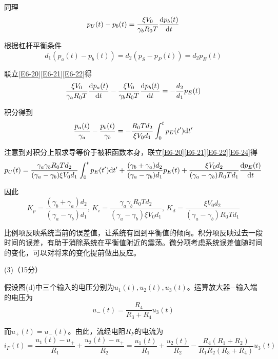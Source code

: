 \documentclass[10pt,a4paper,onecolumn,UTF8]{ctexart}
\begin{document}
	同理
	\begin{equation}\label{E6-21}
		p_U(t)-p_b(t)=\frac{\xi V_0}{\gamma_bR_0T}\frac{\mathrm{d} p_b(t)}{\mathrm{d} t}
	\end{equation}
	
	根据杠杆平衡条件
	\begin{equation}\label{E6-22}
		d_1(p_a(t)-p_b(t))=d_2(p_S-p_P(t))=d_2 p_E(t)
	\end{equation}
	
	联立\eqref{E6-20}\eqref{E6-21}\eqref{E6-22}得
	\begin{equation}\label{E6-23}
		\frac{\xi V_0}{\gamma_aR_0T}\frac{\mathrm{d} p_a(t)}{\mathrm{d} t}-\frac{\xi V_0}{\gamma_bR_0T}\frac{\mathrm{d} p_b(t)}{\mathrm{d} t}=-\frac{d_2}{d_1} p_E(t)
	\end{equation}
	
	积分得到
	\begin{equation}\label{E6-24}
		\frac{p_a(t)}{\gamma_a} -\frac{p_b(t)}{\gamma_b}=-\frac{R_0T d_2}{\xi V_0 d_1}\int_0^t p_E(t')\mathrm{d} t'
	\end{equation}
	
	注意到对积分上限求导等价于被积函数本身，联立\eqref{E6-20}\eqref{E6-21}\eqref{E6-22}\eqref{E6-24}得
	\begin{equation}\label{E6-25}
		p_U(t)=\frac{\gamma_a\gamma_bR_0Td_2}{(\gamma_a-\gamma_b)\xi V_0d_1}\int_0^t p_E(t')\mathrm{d} t'+\frac{(\gamma_b+\gamma_a)d_2}{(\gamma_a-\gamma_b)d_1}p_E(t)+\frac{\xi V_0d_2}{(\gamma_a-\gamma_b)R_0Td_1}\frac{\mathrm{d} p_E(t)}{\mathrm{d} t}
	\end{equation}
	
	因此
	\begin{equation}
		K_p=\frac{(\gamma_b+\gamma_a)d_2}{(\gamma_a-\gamma_b)d_1},\,K_i=\frac{\gamma_a\gamma_bR_0Td_2}{(\gamma_a-\gamma_b)\xi V_0d_1},\,K_d=\frac{\xi V_0d_2}{(\gamma_a-\gamma_b)R_0Td_1}
	\end{equation}
	
	比例项反映系统当前的误差值，让系统有回到平衡值的倾向。积分项反映过去一段时间的误差，有助于消除系统在平衡值附近的震荡。微分项考虑系统误差值随时间的变化，可以对将来的变化提前做出反应。
	
	(3)（15分）
	
	假设图(d)中三个输入的电压分别为$u_1(t),u_2(t),u_3(t)$。运算放大器$-$输入端的电压为
	\begin{equation}
		u_-(t)=\frac{R_4}{R_3+R_4}u_3(t)
	\end{equation}
	
	而$u_+(t)=u_-(t)$。由此，流经电阻$R_F$的电流为
	\begin{equation}
		i_F(t)=\frac{u_1(t)-u_+}{R_1}+\frac{u_2(t)-u_+}{R_2}=\frac{u_1(t)}{R_1}+\frac{u_2(t)}{R_2}-\frac{R_4(R_1+R_2)}{R_1R_2(R_3+R_4)}u_3(t)
	\end{equation}
	
\end{document}
